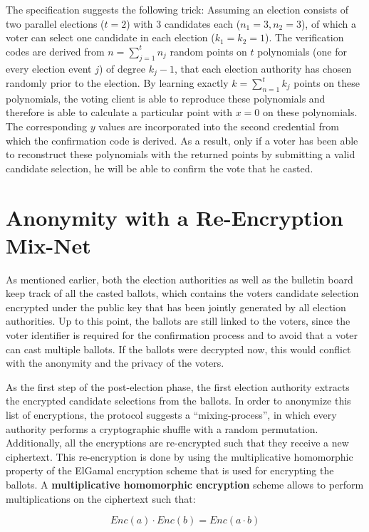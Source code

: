 The specification suggests the following trick: Assuming an election consists of two parallel elections ($t=2$) with 3 candidates each ($n_1 = 3, n_2 = 3$), of which a voter can select one candidate in each election ($k_1 = k_2 =1$). The verification codes are derived from $n = \sum_{j=1}^{t} n_j$ random points on $t$ polynomials (one for every election event $j$) of degree $k_j - 1$, that each election authority has chosen randomly prior to the election. By learning exactly $k = \sum_{n=1}^{t} k_j$ points on these polynomials, the voting client is able to reproduce these polynomials and therefore is able to calculate a particular point with $x=0$ on these polynomials. The corresponding $y$ values are incorporated into the second credential from which the confirmation code is derived. As a result, only if a voter has been able to reconstruct these polynomials with the returned points by submitting a valid candidate selection, he will be able to confirm the vote that he casted.

\section{Anonymity with a Re-Encryption Mix-Net}
As mentioned earlier, both the election authorities as well as the bulletin board keep track of all the casted ballots, which contains the voters candidate selection encrypted under the public key that has been jointly generated by all election authorities. Up to this point, the ballots are still linked to the voters, since the voter identifier is required for the confirmation process and to avoid that a voter can cast multiple ballots. If the ballots were decrypted now, this would conflict with the anonymity and the privacy of the voters.

As the first step of the post-election phase, the first election authority extracts the encrypted candidate selections from the ballots. In order to anonymize this list of encryptions, the protocol suggests a "`mixing-process"', in which every authority performs a cryptographic shuffle with a random permutation. Additionally, all the encryptions are re-encrypted such that they receive a new ciphertext. This re-encryption is done by using the multiplicative homomorphic property of the ElGamal encryption scheme that is used for encrypting the ballots. A \textbf{multiplicative homomorphic encryption} scheme allows to perform multiplications on the ciphertext such that:

\begin{equation*}Enc(a) \cdot Enc(b) = Enc(a \cdot b)\end{equation*}

